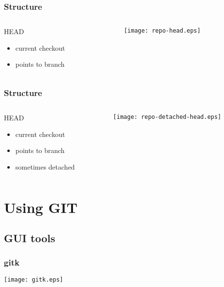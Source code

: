 \documentclass[english]{beamer}
\newcommand{\mysection}[2]{%
  \hypertarget{#2}{}%
  \section{#1}%
  \label{#2}%
}
\newcommand{\mysubsection}[2]{%
  \hypertarget{#2}{}%
  \subsection{#1}%
  \label{#2}%
}
\begin{document}
\begin{frame}
\frametitle{Structure}
\begin{columns}[t]
        \begin{column}[T]{.5\textwidth}
                HEAD
                \begin{itemize}
                        \item current checkout
                        \item points to branch
                \end{itemize}
        \end{column}
        \begin{column}[T]{.5\textwidth}
                \texttt{[image: repo-head.eps]}
        \end{column}
\end{columns}

\end{frame}

\begin{frame}
\frametitle{Structure}
\begin{columns}[t]
        \begin{column}[T]{.5\textwidth}
                HEAD
                \begin{itemize}
                        \item current checkout
                        \item points to branch
                        \item sometimes detached
                \end{itemize}
        \end{column}
        \begin{column}[T]{.5\textwidth}
                \texttt{[image: repo-detached-head.eps]}
        \end{column}
\end{columns}

\end{frame}


\mysection{Using GIT}{_using_git}

\mysubsection{GUI tools}{using:gui}
\begin{frame}[fragile]
\frametitle{gitk}

\begin{center}
\texttt{[image: gitk.eps]}
\end{center}

\end{frame}
\end{document}
